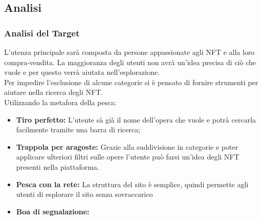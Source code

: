 \documentclass[10pt]{article}
\begin{document}
\subsection{Analisi}
\subsubsection{Analisi del Target}
L'utenza principale sarà composta da persone appassionate agli NFT e alla loro compra-vendita. La maggioranza degli utenti non avrà un'idea precisa di ciò che vuole e per questo verrà aiutata nell'esplorazione.\\
Per impedire l'esclusione di alcune categorie si è pensato di fornire strumenti per aiutare nella ricerca degli NFT.\\
Utilizzando la metafora della pesca:
\begin{itemize}
    \item \textbf{Tiro perfetto:} L'utente sà già il nome dell'opera che vuole e potrà cercarla facilmente tramite una barra di ricerca;
    \item \textbf{Trappola per aragoste:} Grazie alla suddivisione in categorie e poter applicare ulteriori filtri sulle opere l'utente può farsi un'idea degli NFT presenti nella piattaforma.
    \item \textbf{Pesca con la rete:} La struttura del sito è semplice, quindi permette agli utenti di esplorare il sito senza sovraccarico
    \item \textbf{Boa di segnalazione:} 
\end{itemize}
\end{document}
